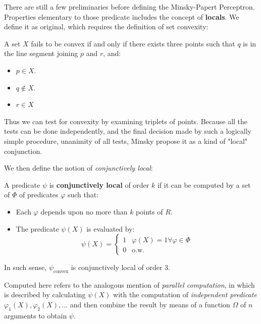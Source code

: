 There are still a few preliminaries before defining the Minsky-Papert Perceptron. Properties elementary to those predicate includes the concept of \textbf{locals}. We define it as original, which requires the definition of set convexity: 
\begin{definition}
    A set $X$ fails to be convex if and only if there exists three points such that $q$ is in the line segment joining $p$ and $r$, and: 
    \begin{itemize}[noitemsep,topsep=0pt]
        \item $p\in X$. 
        \item $q\not\in X$. 
        \item $r\in X$
    \end{itemize}
\end{definition}
Thus we can test for convexity by examining triplets of points. Because all the tests can be done independently, and the final decision made by such a logically simple procedure, unanimity of all tests, Minsky propose it as a kind of "local" conjunction. 

We then define the notion of \textit{conjunctively local}:
\begin{definition}
    A predicate $\psi$ is \textbf{conjunctively local} of order $k$ if it can be computed by a set of $\Phi$ of predicates $\varphi$ such that: 
    \begin{itemize}
        \item Each $\varphi$ depends upon no more than $k$ points of $R$. 
        \item The predicate $\psi(X)$ is evaluated by: \begin{equation}
            \psi(X) = \begin{cases}
                1 & \varphi(X) = 1\forall \varphi \in \Phi \\
                0 & \text{o.w.}
            \end{cases}
        \end{equation}
    \end{itemize}
    In such sense, $\psi_{\text{convex}}$ is conjunctively local of order 3.
\end{definition}

Computed here refers to the analogous mention of \textit{parallel computation}, in which is described by calculating $\psi(X)$ with the computation of \textit{independent predicate} $\varphi_{1}(X),\varphi_{2}(X),\dots$ and then combine the result by means of a function $\Omega$ of $n$ arguments to obtain $\psi$. 

